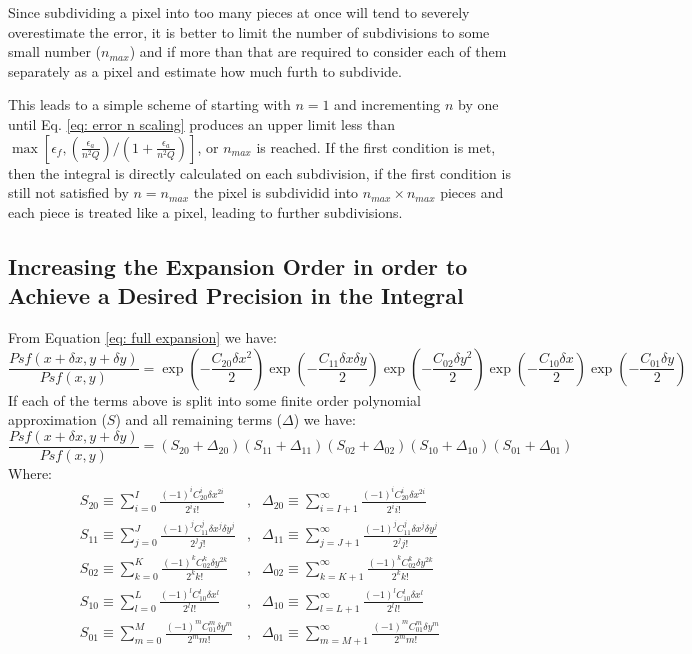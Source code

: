 \documentclass{article}
\begin{document}
Since subdividing a pixel into too many pieces at once will tend to severely
overestimate the error, it is better to limit the number of subdivisions to
some small number ($n_{max}$) and if more than that are required to consider
each of them separately as a pixel and estimate how much furth to subdivide.

This leads to a simple scheme of starting with $n=1$ and incrementing $n$ by
one until Eq. \ref{eq: error n scaling} produces an upper limit less than
$\max\left[\epsilon_f,
\left(\frac{\epsilon_a}{n^2Q}\right)/\left(1+\frac{\epsilon_a}{n^2Q}\right)
\right]$, or $n_{max}$ is reached. If the first condition is met, then the
integral is directly calculated on each subdivision, if the first condition
is still not satisfied by $n=n_{max}$ the pixel is subdividid into
$n_{max}\times n_{max}$ pieces and each piece is treated like a pixel,
leading to further subdivisions.

\subsection{Increasing the Expansion Order in order to Achieve a Desired
Precision in the Integral}

From Equation \ref{eq: full expansion} we have:
\begin{equation}
	\frac{Psf(x+\delta x, y+\delta y)}{Psf(x,y)}=
	\exp\left(-\frac{C_{20}\delta x^2}{2}\right)
	\exp\left(-\frac{C_{11}\delta x\delta y}{2}\right)
	\exp\left(-\frac{C_{02}\delta y^2}{2}\right)
	\exp\left(-\frac{C_{10}\delta x}{2}\right)
	\exp\left(-\frac{C_{01}\delta y}{2}\right)
\end{equation}
If each of the terms above is split into some finite order polynomial
approximation ($S$) and all remaining terms ($\Delta$) we have:
\begin{equation}
	\frac{Psf(x+\delta x, y+\delta y)}{Psf(x,y)}=(S_{20}+\Delta_{20})
	(S_{11}+\Delta_{11})(S_{02}+\Delta_{02})(S_{10}+\Delta_{10})
	(S_{01}+\Delta_{01})
\end{equation}
Where:
\begin{eqnarray}
	S_{20}\equiv \sum_{i=0}^I \frac{(-1)^i C_{20}^i \delta x^{2i}}{2^i i!}
	&,&
	\Delta_{20}\equiv \sum_{i=I+1}^\infty
	\frac{(-1)^i C_{20}^i \delta x^{2i}}{2^i i!}\\
%
	S_{11}\equiv \sum_{j=0}^J \frac{(-1)^j C_{11}^j \delta x^j \delta y^j}
	{2^j j!}
	&,&
	\Delta_{11}\equiv \sum_{j=J+1}^\infty \frac{(-1)^j C_{11}^j \delta x^j
	\delta y^j}{2^j j!}\\
%
	S_{02}\equiv \sum_{k=0}^K \frac{(-1)^k C_{02}^k \delta y^{2k}}{2^k k!}
	&,&
	\Delta_{02}\equiv \sum_{k=K+1}^\infty
	\frac{(-1)^k C_{02}^k \delta y^{2k}}{2^k k!}\\
%
	S_{10}\equiv \sum_{l=0}^L \frac{(-1)^l C_{10}^l \delta x^l}{2^l l!}
	&,&
	\Delta_{10}\equiv \sum_{l=L+1}^\infty
	\frac{(-1)^l C_{10}^l \delta x^l}{2^l l!}\\
%
	S_{01}\equiv \sum_{m=0}^M \frac{(-1)^m C_{01}^m \delta y^m}{2^m m!}
	&,&
	\Delta_{01}\equiv \sum_{m=M+1}^\infty
	\frac{(-1)^m C_{01}^m \delta y^m}{2^m m!}\\
\end{eqnarray}
\end{document}
